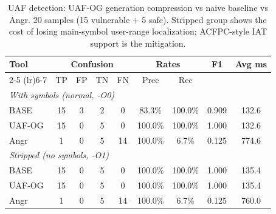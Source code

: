 \begin{table}[t]
\centering
\caption{UAF detection: UAF-OG generation compression vs naive baseline vs Angr. 20 samples (15 vulnerable + 5 safe). Stripped group shows the cost of losing main-symbol user-range localization; ACFPC-style IAT support is the mitigation.}
\label{tab:uaf-og}
\begin{tabular}{lcccccccc}
\toprule
\multirow{2}{*}{Tool} & \multicolumn{4}{c}{Confusion} & \multicolumn{2}{c}{Rates} & \multirow{2}{*}{F1} & \multirow{2}{*}{Avg ms} \\
\cmidrule(lr){2-5} \cmidrule(lr){6-7}
 & TP & FP & TN & FN & Prec & Rec & & \\
\midrule
\multicolumn{9}{l}{\emph{With symbols (normal, -O0)}} \\
BASE & 15 & 3 & 2 & 0 & 83.3\% & 100.0\% & 0.909 & 132.6 \\
UAF-OG & 15 & 0 & 5 & 0 & 100.0\% & 100.0\% & 1.000 & 132.6 \\
Angr & 1 & 0 & 5 & 14 & 100.0\% & 6.7\% & 0.125 & 774.6 \\
\midrule
\multicolumn{9}{l}{\emph{Stripped (no symbols, -O1)}} \\
BASE & 15 & 0 & 5 & 0 & 100.0\% & 100.0\% & 1.000 & 135.4 \\
UAF-OG & 15 & 0 & 5 & 0 & 100.0\% & 100.0\% & 1.000 & 135.4 \\
Angr & 1 & 0 & 5 & 14 & 100.0\% & 6.7\% & 0.125 & 760.0 \\
\bottomrule
\end{tabular}
\end{table}
